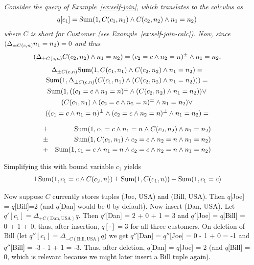 \begin{example}\em
\label{ex:self-join-delta}
Consider the query of Example~\ref{ex:self-join}, which translates to the
calculus as
\[
q[c_1] = \mbox{Sum}(1, C(c_1,n_1) \land C(c_2, n_2) \land n_1=n_2)
\]
where $C$ is short for Customer (see Example~\ref{ex:self-join-calc}).
Now, since $(\Delta_{\pm C(c,n)} n_1=n_2) = 0$ and thus
\[
(\Delta_{\pm C(c,n)} C(c_2, n_2) \land n_1=n_2) = (c_2=c \land n_2=n)^\pm \land n_1=n_2,
\]
\begin{multline*}
\Delta_{\pm C(c,n)} \mbox{Sum}(1, C(c_1,n_1) \land C(c_2, n_2) \land n_1=n_2) = \\
\mbox{Sum}(1, \Delta_{\pm C(c,n)} (C(c_1,n_1) \land (C(c_2, n_2) \land n_1=n_2))) = \\
\mbox{Sum}(1, 
((c_1=c \land n_1=n)^\pm \land (C(c_2, n_2) \land n_1=n_2)) \lor \\
(C(c_1,n_1) \land (c_2=c \land n_2=n)^\pm \land n_1=n_2) \lor \\
((c_1=c \land n_1=n)^\pm \land (c_2=c \land n_2=n)^\pm \land n_1=n_2) =
\end{multline*}

\vspace{-6mm}

\begin{eqnarray*}
&\pm& \mbox{Sum}(1, c_1=c \land n_1=n \land C(c_2, n_2)       \land n_1=n_2) \\
&\pm& \mbox{Sum}(1, C(c_1,n_1)        \land c_2=c \land n_2=n \land n_1=n_2) \\
&+&   \mbox{Sum}(1, c_1=c \land n_1=n \land c_2=c \land n_2=n \land n_1=n_2)
\end{eqnarray*}

Simplifying this with bound variable $c_1$ yields
\[
\pm \mbox{Sum}(1, c_1=c \land C(c_2, n))
\pm \mbox{Sum}(1, C(c_1,n))
+   \mbox{Sum}(1, c_1=c)
\]

Now suppose $C$ currently stores tuples (Joe, USA) and (Bill, USA).
Then $q$[Joe] = $q$[Bill]=2 (and $q$[Dan] would be 0 by default).
Now insert (Dan, USA).
Let $q'[c_1] = \Delta_{+C(\mathrm{Dan}, \mathrm{USA})} q$.
Then $q'$[Dan] = 2 + 0 + 1 = 3 and
$q'$[Joe] = $q$[Bill] = 0 + 1 + 0, thus, after insertion,
$q[\cdot] = 3$ for all three customers.
On deletion of Bill (let
$q''[c_1] = \Delta_{-C(\mathrm{Bill}, \mathrm{USA})} q$) we get
$q''$[Dan] = $q''$[Joe] = 0 - 1 + 0 = -1 and
$q''$[Bill] = -3 - 1 + 1 = -3. Thus, after deletion,
$q$[Dan] = $q$[Joe] = 2 (and $q$[Bill] = 0, which is relevant because we might
later insert a Bill tuple again).


\end{example}
